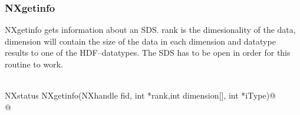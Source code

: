 \documentclass[12pt]{article}
\begin{document}
\subsubsection{NXgetinfo}
NXgetinfo gets information about an SDS. rank is the dimesionality of the
data, dimension will contain the size of the data in each dimension and
datatype results to one of the HDF--datatypes. The SDS has to be open in
order for this routine to work.
\begin{flushleft} \small
\begin{minipage}{\linewidth} \label{scrap20}
\vspace{-1ex}
\begin{list}{}{} \item
\mbox{}\verb@@\\
\mbox{}\verb@   NXstatus NXgetinfo(NXhandle fid, int *rank,int dimension[], int *iType)@\\
\mbox{}@\\
\end{list}
\vspace{-1ex}
\footnotesize\addtolength{\baselineskip}{-1ex}
\end{minipage}\\[4ex]
\end{flushleft}
\end{document}
